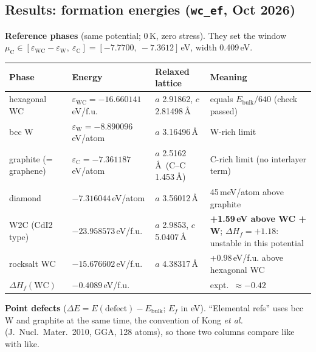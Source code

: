 \documentclass[10pt]{article}
\begin{document}
\subsection*{Results: formation energies (\texttt{wc\_ef}, Oct 2026)}
\textbf{Reference phases} (same potential; 0\,K, zero stress). They set the window
$\mu_\mathrm C\in[\varepsilon_\mathrm{WC}-\varepsilon_\mathrm W,\ \varepsilon_\mathrm C] = [-7.7700,\ -7.3612]$\,eV, width 0.409\,eV.

\begin{xltabular}{\linewidth}{L{3.2cm} L{3.4cm} L{4.2cm} Y}
\toprule
\textbf{Phase} & \textbf{Energy} & \textbf{Relaxed lattice} & \textbf{Meaning} \\
\midrule\endhead
hexagonal WC & $\varepsilon_\mathrm{WC} = -16.660141$\,eV/f.u. & $a$ 2.91862, $c$ 2.81498\,\AA & equals $E_\mathrm{bulk}/640$ (check passed) \\
bcc W & $\varepsilon_\mathrm W = -8.890096$\,eV/atom & $a$ 3.16496\,\AA & W-rich limit \\
graphite (= graphene) & $\varepsilon_\mathrm C = -7.361187$\,eV/atom & $a$ 2.5162\,\AA\ (C--C 1.453\,\AA) & C-rich limit (no interlayer term) \\
diamond & $-7.316044$\,eV/atom & $a$ 3.56012\,\AA & 45\,meV/atom above graphite \\
W2C (CdI2 type) & $-23.958573$\,eV/f.u. & $a$ 2.9853, $c$ 5.0407\,\AA & \textbf{+1.59\,eV above WC + W}; $\Delta H_f = +1.18$: unstable in this potential \\
rocksalt WC & $-15.676602$\,eV/f.u. & $a$ 4.38317\,\AA & +0.98\,eV/f.u. above hexagonal WC \\
$\Delta H_f(\mathrm{WC})$ & $-0.4089$\,eV/f.u. & & expt.\ $\approx-0.42$ \\
\bottomrule
\end{xltabular}

\textbf{Point defects} ($\Delta E = E(\text{defect}) - E_\mathrm{bulk}$; $E_f$ in eV). ``Elemental refs'' uses bcc W and graphite at the same time, the convention of Kong \emph{et al.} (J.\ Nucl.\ Mater.\ 2010, GGA, 128 atoms), so those two columns compare like with like.
\end{document}
